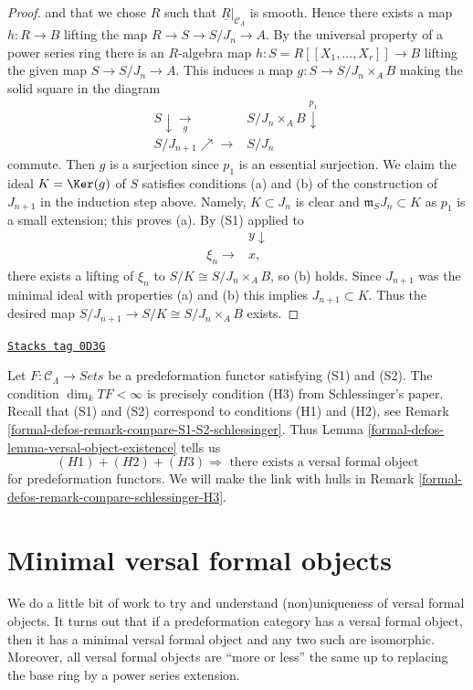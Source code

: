 \begin{proof}
and that we chose $R$ such that $\underline{R}|_{\mathcal{C}_\Lambda}$
is smooth. Hence there exists a map $h : R \to B$ lifting the map
$R \to S \to S/J_n \to A$. By the universal property of a power series
ring there is an $R$-algebra map $h : S = R[[X_1, \ldots, X_r]] \to B$
lifting the given map $S \to S/J_n \to A$. This induces a map
$g: S \to S/J_n \times_A B$ making the solid square in the diagram
$$
\begin{array}{cc}S \downarrow\underset{g}{\longrightarrow} & S/J_n \times_A B \overset{p_1}{\downarrow} \\ S/J_{n + 1} \nearrow\longrightarrow & S/J_n\end{array}
$$
commute. Then $g$ is a surjection since $p_1$ is an essential surjection.
We claim the ideal $K = \Ker(g)$ of $S$ satisfies conditions (a) and
(b) of the construction of $J_{n + 1}$ in the induction step above.
Namely, $K \subset J_n$ is clear and $\mathfrak m_SJ_n \subset K$ as $p_1$
is a small extension; this proves (a). By (S1) applied to
$$
\begin{array}{cc} & y \downarrow \\ \xi_n \longrightarrow & x,\end{array}
$$
there exists a lifting of $\xi_n$ to $S/K \cong S/J_n \times_A B$, so (b)
holds. Since $J_{n + 1}$ was the minimal ideal with properties (a) and (b)
this implies $J_{n + 1} \subset K$. Thus the desired map
$S/J_{n+1} \to S/K \cong S/J_n \times_A B$ exists.
\end{proof}

\begin{remark}
\label{formal-defos-remark-compare-schlessinger-H3-pre}
\href{https://stacks.math.columbia.edu/tag/0D3G}{\texttt{Stacks tag 0D3G}}

Let $F : \mathcal{C}_\Lambda \to \textit{Sets}$ be a predeformation functor
satisfying (S1) and (S2). The condition $\dim_k TF < \infty$
is precisely condition (H3) from Schlessinger's paper.
Recall that (S1) and (S2) correspond to conditions (H1) and (H2), see
Remark \ref{formal-defos-remark-compare-S1-S2-schlessinger}.
Thus Lemma \ref{formal-defos-lemma-versal-object-existence} tells us
$$
(H1) + (H2) + (H3)
\Rightarrow
\text{ there exists a versal formal object}
$$
for predeformation functors. We will make the link with hulls in
Remark \ref{formal-defos-remark-compare-schlessinger-H3}.
\end{remark}

\section{Minimal versal formal objects}
\label{formal-defos-section-minimal-versal}
We do a little bit of work to try and understand (non)uniqueness
of versal formal objects. It turns out that if a predeformation category
has a versal formal object, then it has a minimal versal formal
object and any two such are isomorphic. Moreover, all versal formal
objects are ``more or less'' the same up to replacing the base ring
by a power series extension.


